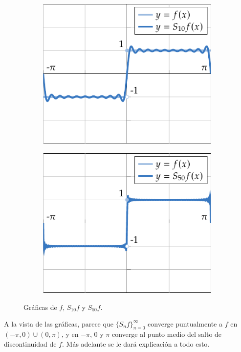 \documentclass[a4paper, 11pt, oneside]{report}
\begin{document}
\begin{example}
  \begin{figure}[H]
    \centering
    \begin{subfigure}[b]{0.49\textwidth}
      \centering
      \includegraphics{./plot13/main.pdf}
    \end{subfigure}
    \begin{subfigure}[b]{0.49\textwidth}
      \centering
      \includegraphics{./plot14/main.pdf}
    \end{subfigure}
    \caption{Gráficas de $f$, $S_{10}f$ y $S_{50}f$.}
  \end{figure}

  A la vista de las gráficas, parece que $\{S_nf\}_{n=0}^\infty$ converge puntualmente a $f$ en $(-\pi,0) \cup (0,\pi)$, y en $-\pi$, $0$ y $\pi$ converge al punto medio del salto de discontinuidad de $f$. Más adelante se le dará explicación a todo esto.
\end{example}
\end{document}
